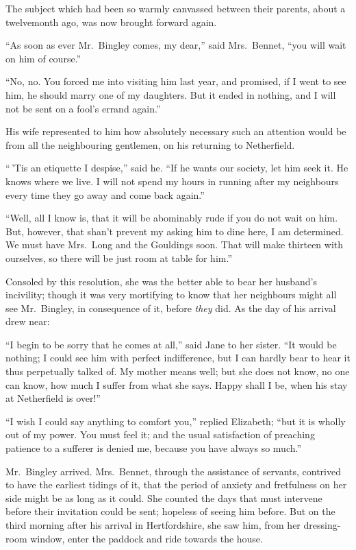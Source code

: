 The subject which had been so warmly canvassed between their
parents, about a twelvemonth ago, was now brought forward
again.

``As soon as ever Mr.\ Bingley comes, my dear,'' said Mrs.\ Bennet,
``you will wait on him of course.''

``No, no.  You forced me into visiting him last year, and
promised, if I went to see him, he should marry one of my
daughters.  But it ended in nothing, and I will not be sent on
a fool's errand again.''

His wife represented to him how absolutely necessary such an
attention would be from all the neighbouring gentlemen, on his
returning to Netherfield.

``\,'Tis an etiquette I despise,'' said he.  ``If he wants our
society, let him seek it.  He knows where we live.  I will not
spend my hours in running after my neighbours every time they
go away and come back again.''

``Well, all I know is, that it will be abominably rude if you do
not wait on him.  But, however, that shan't prevent my asking
him to dine here, I am determined.  We must have Mrs.\ Long and
the Gouldings soon.  That will make thirteen with ourselves, so
there will be just room at table for him.''

Consoled by this resolution, she was the better able to bear
her husband's incivility; though it was very mortifying to know
that her neighbours might all see Mr.\ Bingley, in consequence
of it, before \emph{they} did.  As the day of his arrival drew near:

``I begin to be sorry that he comes at all,'' said Jane to her
sister.  ``It would be nothing; I could see him with perfect
indifference, but I can hardly bear to hear it thus perpetually
talked of.  My mother means well; but she does not know, no one
can know, how much I suffer from what she says.  Happy shall I
be, when his stay at Netherfield is over!''

``I wish I could say anything to comfort you,'' replied Elizabeth;
``but it is wholly out of my power.  You must feel it; and the
usual satisfaction of preaching patience to a sufferer is denied
me, because you have always so much.''

Mr.\ Bingley arrived.  Mrs.\ Bennet, through the assistance of
servants, contrived to have the earliest tidings of it, that
the period of anxiety and fretfulness on her side might be as
long as it could.  She counted the days that must intervene
before their invitation could be sent; hopeless of seeing
him before.  But on the third morning after his arrival in
Hertfordshire, she saw him, from her dressing-room window,
enter the paddock and ride towards the house.

